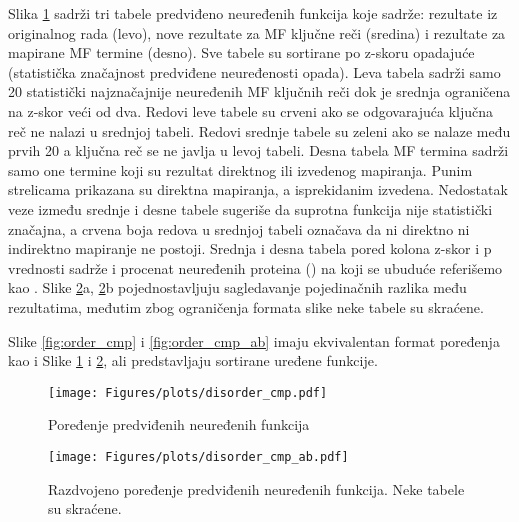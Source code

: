 Slika \ref{fig:disorder_cmp} sadrži tri tabele predviđeno neuređenih funkcija
koje sadrže: rezultate iz originalnog rada \cite{Xie2007} (levo), nove
rezultate za MF ključne reči (sredina) i rezultate za mapirane MF termine
(desno). Sve tabele su sortirane po z-skoru opadajuće (statistička značajnost
predviđene neuređenosti opada).  Leva tabela sadrži samo 20 statistički
najznačajnije neuređenih MF ključnih reči dok je srednja ograničena na z-skor
veći od dva.  Redovi leve tabele su crveni ako se odgovarajuća ključna reč ne
nalazi u srednjoj tabeli.  Redovi srednje tabele su zeleni ako se nalaze među
prvih 20 a ključna reč se ne javlja u levoj tabeli.  Desna tabela MF termina
sadrži samo one termine koji su rezultat direktnog ili izvedenog mapiranja.
Punim strelicama prikazana su direktna mapiranja, a isprekidanim izvedena.
Nedostatak veze između srednje i desne tabele sugeriše da suprotna funkcija
nije statistički značajna, a crvena boja redova u srednjoj tabeli označava da
ni direktno ni indirektno mapiranje ne postoji.  Srednja i desna tabela pored
kolona z-skor i p vrednosti sadrže i procenat neuređenih proteina
() na koji se ubuduće referišemo kao . Slike \ref{fig:disorder_cmp_ab}a, \ref{fig:disorder_cmp_ab}b
pojednostavljuju sagledavanje pojedinačnih razlika među rezultatima, međutim
zbog ograničenja formata slike neke tabele su skraćene.

Slike \ref{fig:order_cmp} i \ref{fig:order_cmp_ab}  imaju ekvivalentan format
poređenja kao i Slike \ref{fig:disorder_cmp} i \ref{fig:disorder_cmp_ab}, ali
predstavljaju sortirane uređene funkcije.



\clearpage

\begin{figure}[th]
\hspace*{-2.5cm} 
\texttt{[image: Figures/plots/disorder\_cmp.pdf]}
\decoRule
\caption {
  Poređenje predviđenih neuređenih funkcija
}
\label{fig:disorder_cmp}
\end{figure}

\clearpage

\begin{figure}[th]
\hspace*{-1.0cm} 
\texttt{[image: Figures/plots/disorder\_cmp\_ab.pdf]}
\decoRule
\caption {
  Razdvojeno poređenje predviđenih neuređenih funkcija. Neke tabele su skraćene.
}
\label{fig:disorder_cmp_ab}
\end{figure}

